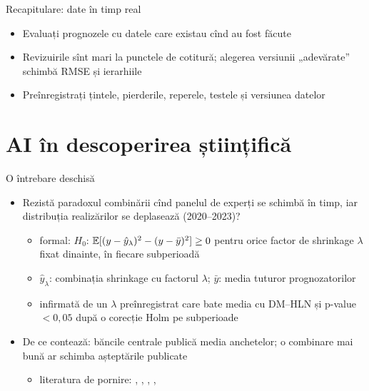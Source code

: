 \begin{frame}{Recapitulare: date în timp real}
\itemsize{\small}
\begin{itemize}
    \item Evaluați prognozele cu datele care existau cînd au fost făcute
    \item Revizuirile sînt mari la punctele de cotitură; alegerea versiunii „adevărate” schimbă RMSE și ierarhiile
    \item Preînregistrați țintele, pierderile, reperele, testele și versiunea datelor
\end{itemize}
\end{frame}


\section{AI în descoperirea științifică}

\begin{frame}{O întrebare deschisă}
\itemsize{\small}
\begin{itemize}
    \item Rezistă paradoxul combinării cînd panelul de experți se schimbă în timp, iar distribuția realizărilor se deplasează (2020--2023)?
    \begin{itemize}
        \item formal: $H_0$: $\mathbb{E}[(y - \hat y_{\lambda})^2 - (y - \bar y)^2] \ge 0$ pentru orice factor de shrinkage $\lambda$ fixat dinainte, în fiecare subperioadă
        \item $\hat y_\lambda$: combinația shrinkage cu factorul $\lambda$; $\bar y$: media tuturor prognozatorilor
        \item infirmată de un $\lambda$ preînregistrat care bate media cu DM--HLN și p-value $< 0{,}05$ după o corecție Holm pe subperioade
    \end{itemize}
    \item De ce contează: băncile centrale publică media anchetelor; o combinare mai bună ar schimba așteptările publicate
    \begin{itemize}
        \item literatura de pornire: , , , , 
    \end{itemize}
\end{itemize}
\end{frame}

